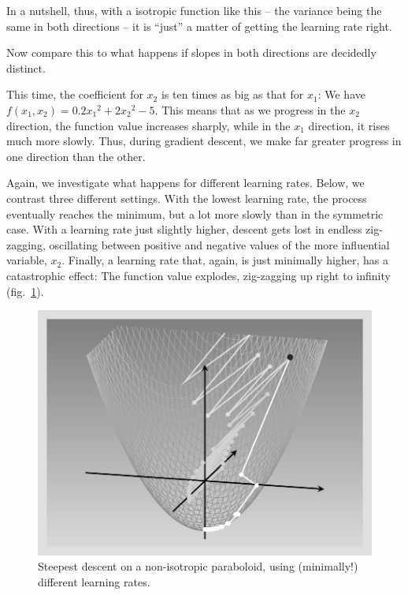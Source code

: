 \documentclass[
  letterpaper,
]{krantz}
\begin{document}
In a nutshell, thus, with a isotropic function like this -- the variance
being the same in both directions -- it is ``just'' a matter of getting
the learning rate right.

Now compare this to what happens if slopes in both directions are
decidedly distinct.

This time, the coefficient for \(x_2\) is ten times as big as that for
\(x_1\): We have \(f(x_1, x_2) = 0.2 {x_1}^2 + 2 {x_2}^2 - 5\). This
means that as we progress in the \(x_2\) direction, the function value
increases sharply, while in the \(x_1\) direction, it rises much more
slowly. Thus, during gradient descent, we make far greater progress in
one direction than the other.

Again, we investigate what happens for different learning
rates. Below, we contrast three different settings.
With the lowest learning rate, the process eventually reaches the
minimum, but a lot more slowly than in the symmetric case. With a
learning rate just slightly higher, descent gets lost in endless
zig-zagging, oscillating between positive and negative values of the
more influential variable, \(x_2\). Finally, a learning rate that,
again, is just minimally higher, has a catastrophic effect: The function
value explodes, zig-zagging up right to infinity
(fig.~\ref{fig-optimizers-steepest-descent-elliptic}).

\begin{figure}[H]

{\centering \includegraphics{images/optimizers-steepest-descent-elliptic.png}

}

\caption{\label{fig-optimizers-steepest-descent-elliptic}Steepest
descent on a non-isotropic paraboloid, using (minimally!) different
learning rates.}

\end{figure}
\end{document}
